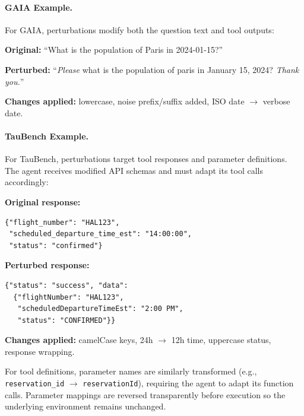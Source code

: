 \documentclass[11pt]{article}
\begin{document}
\paragraph{GAIA Example.}

For GAIA, perturbations modify both the question text and tool outputs:

\begin{tcolorbox}[
    colback=gray!5!white,
    colframe=gray!50!black,
    title={\textbf{GAIA Structural Perturbation (Medium)}},
    fonttitle=\bfseries\small,
    boxrule=0.5pt,
    arc=2pt
]
\small
\textbf{Original:} ``What is the population of Paris in 2024-01-15?''

\textbf{Perturbed:} ``\textit{Please} what is the population of paris in January 15, 2024? \textit{Thank you.}''

\vspace{0.3em}
\textbf{Changes applied:} lowercase, noise prefix/suffix added, ISO date $\to$ verbose date.
\end{tcolorbox}

\paragraph{TauBench Example.}

For TauBench, perturbations target tool responses and parameter definitions. The agent receives modified API schemas and must adapt its tool calls accordingly:

\begin{tcolorbox}[
    colback=gray!5!white,
    colframe=gray!50!black,
    title={\textbf{TauBench Tool Response Perturbation (Medium)}},
    fonttitle=\bfseries\small,
    boxrule=0.5pt,
    arc=2pt,
    breakable
]
\small
\textbf{Original response:}
\begin{verbatim}
{"flight_number": "HAL123",
 "scheduled_departure_time_est": "14:00:00",
 "status": "confirmed"}
\end{verbatim}

\textbf{Perturbed response:}
\begin{verbatim}
{"status": "success", "data":
  {"flightNumber": "HAL123",
   "scheduledDepartureTimeEst": "2:00 PM",
   "status": "CONFIRMED"}}
\end{verbatim}

\textbf{Changes applied:} camelCase keys, 24h $\to$ 12h time, uppercase status, response wrapping.
\end{tcolorbox}

For tool definitions, parameter names are similarly transformed (e.g., \texttt{reservation\_id} $\to$ \texttt{reservationId}), requiring the agent to adapt its function calls. Parameter mappings are reversed transparently before execution so the underlying environment remains unchanged.
\end{document}
